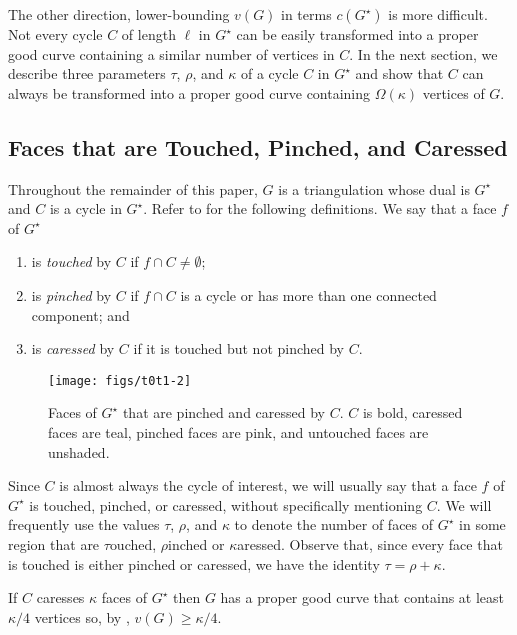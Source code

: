 \documentclass{patmorin}
\newcommand{\dual}[1]{{#1}^\star}
\begin{document}
The other direction, lower-bounding $v(G)$ in terms $c(\dual{G})$
is more difficult. Not every cycle $C$ of length $\ell$ in $\dual{G}$
can be easily transformed into a proper good curve containing a similar
number of vertices in $C$.  In the next section, we describe three
parameters $\tau$, $\rho$, and $\kappa$ of a cycle $C$ in $\dual{G}$
and show that $C$ can always be transformed into a proper good curve
containing $\Omega(\kappa)$ vertices of $G$.

\subsection{Faces that are Touched, Pinched, and Caressed}

Throughout the remainder of this paper, $G$ is a triangulation
whose dual is $\dual{G}$ and $C$ is a cycle in $\dual{G}$.
Refer to  for the following definitions.
We say that a face $f$ of $\dual{G}$
\begin{enumerate}
  \item is \emph{touched} by $C$ if $f\cap C\neq \emptyset$;
  \item is \emph{pinched} by $C$ if $f\cap C$ is a cycle or has more than
    one connected component; and
  \item is \emph{caressed} by $C$ if it is touched but not pinched by $C$.
\end{enumerate}

\begin{figure}
  \begin{center}
    \texttt{[image: figs/t0t1-2]}
  \end{center}
  \caption{Faces of $\dual{G}$ that are pinched and caressed by $C$. $C$
  is bold, caressed faces are teal, pinched faces are pink, and untouched
  faces are unshaded.} 
\end{figure}


Since $C$ is almost always the cycle of interest, we will usually say
that a face $f$ of $\dual{G}$ is touched, pinched, or caressed, without
specifically mentioning $C$.  We will frequently use the values $\tau$,
$\rho$, and $\kappa$ to denote the number of faces of $\dual{G}$ in
some region that are $\tau$ouched, $\rho$inched or $\kappa$aressed.
Observe that, since every face that is touched is either pinched or
caressed, we have the identity $\tau = \rho + \kappa$.

\begin{lem}
   If $C$ caresses $\kappa$ faces of $\dual{G}$ then $G$ has a proper
   good curve that contains at least $\kappa/4$ vertices so, by
   , $v(G)\ge \kappa/4$.
\end{lem}
\end{document}
